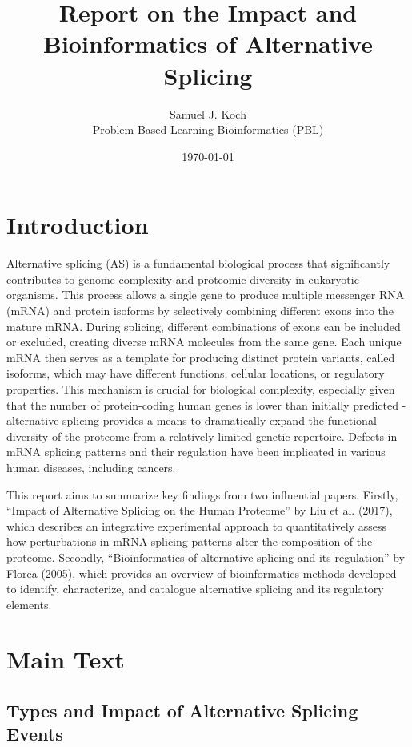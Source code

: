 \documentclass[12pt,a4paper]{article}
\title{Report on the Impact and Bioinformatics of Alternative Splicing}
\author{Samuel J. Koch \\
        Problem Based Learning Bioinformatics (PBL)}
\date{\today}
\begin{document}
\maketitle

\doublespacing

\section{Introduction}

Alternative splicing (AS) is a fundamental biological process that significantly contributes to genome complexity and proteomic diversity in eukaryotic organisms. This process allows a single gene to produce multiple messenger RNA (mRNA) and protein isoforms by selectively combining different exons into the mature mRNA. During splicing, different combinations of exons can be included or excluded, creating diverse mRNA molecules from the same gene. Each unique mRNA then serves as a template for producing distinct protein variants, called isoforms, which may have different functions, cellular locations, or regulatory properties. This mechanism is crucial for biological complexity, especially given that the number of protein-coding human genes is lower than initially predicted - alternative splicing provides a means to dramatically expand the functional diversity of the proteome from a relatively limited genetic repertoire. Defects in mRNA splicing patterns and their regulation have been implicated in various human diseases, including cancers.

This report aims to summarize key findings from two influential papers. Firstly, ``Impact of Alternative Splicing on the Human Proteome'' by Liu et al. (2017), which describes an integrative experimental approach to quantitatively assess how perturbations in mRNA splicing patterns alter the composition of the proteome. Secondly, ``Bioinformatics of alternative splicing and its regulation'' by Florea (2005), which provides an overview of bioinformatics methods developed to identify, characterize, and catalogue alternative splicing and its regulatory elements.

\section{Main Text}

\subsection{Types and Impact of Alternative Splicing Events}
\end{document}
